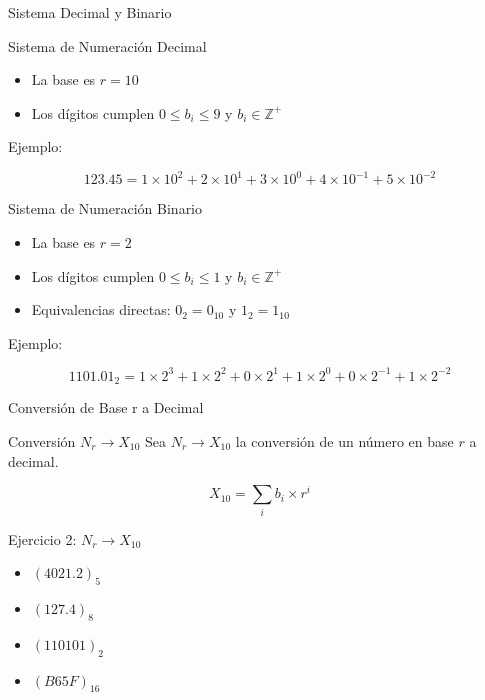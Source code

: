 \documentclass[presentation]{beamer}
\begin{document}
\begin{frame}[label={sec:org0353fa6}]{Sistema Decimal y Binario}
\begin{block}{Sistema de Numeración Decimal}
\begin{itemize}
\item La base es \(r=10\)
\item Los dígitos cumplen \(0 \leq b_i \leq 9\) y \(b_i \in \mathbb{Z}^+\)
\end{itemize}

Ejemplo:

$$123.45 = 1\times10^2 + 2\times10^1 + 3\times10^0 + 4\times10^{-1} + 5\times10^{-2}$$
\end{block}

\begin{block}{Sistema de Numeración Binario}
\begin{itemize}
\item La base es \(r=2\)
\item Los dígitos cumplen \(0 \leq b_i \leq 1\) y \(b_i \in \mathbb{Z}^+\)
\item Equivalencias directas: \(0_2 = 0_{10}\) y \(1_2 = 1_{10}\)
\end{itemize}

Ejemplo:

$$1101.01_2 = 1\times2^3 + 1\times2^2 + 0\times2^1 + 1\times2^0 + 0\times2^{-1} + 1\times2^{-2}$$
\end{block}
\end{frame}

\begin{frame}[label={sec:orgddc683a}]{Conversión de Base r a Decimal}
\begin{block}{Conversión \(N_r \rightarrow X_{10}\)}
Sea \(N_r \rightarrow X_{10}\) la conversión de un número en base \(r\) a decimal.

$$X_{10} = \sum_i b_i \times r^i$$
\end{block}

\begin{block}{Ejercicio 2: \(N_r \rightarrow X_{10}\)}
\begin{itemize}
\item \((4021.2)_5\)
\item \((127.4)_8\)
\item \((110101)_2\)
\item \((B65F)_{16}\)
\end{itemize}
\end{block}
\end{frame}
\end{document}
